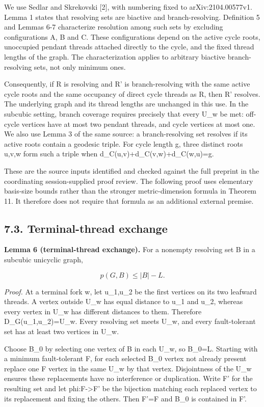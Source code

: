 \documentclass[
]{article}
\newcounter{none} %
\begin{document}
We use Sedlar and Skrekovski {[}2{]}, with numbering fixed to
arXiv:2104.00577v1. Lemma 1 states that resolving sets are biactive and
branch-resolving. Definition 5 and Lemmas 6-7 characterize resolution
among such sets by excluding configurations A, B and C. These
configurations depend on the active cycle roots, unoccupied pendant
threads attached directly to the cycle, and the fixed thread lengths of
the graph. The characterization applies to arbitrary biactive
branch-resolving sets, not only minimum ones.

Consequently, if R is resolving and R' is branch-resolving with the same
active cycle roots and the same occupancy of direct cycle threads as R,
then R' resolves. The underlying graph and its thread lengths are
unchanged in this use. In the subcubic setting, branch coverage requires
precisely that every U\_w be met: off-cycle vertices have at most two
pendant threads, and cycle vertices at most one. We also use Lemma 3 of
the same source: a branch-resolving set resolves if its active roots
contain a geodesic triple. For cycle length g, three distinct roots
u,v,w form such a triple when d\_C(u,v)+d\_C(v,w)+d\_C(w,u)=g.

These are the source inputs identified and checked against the full
preprint in the coordinating session-supplied proof review. The
following proof uses elementary basis-size bounds rather than the
stronger metric-dimension formula in Theorem 11. It therefore does not
require that formula as an additional external premise.

\subsection{7.3. Terminal-thread
exchange}\label{terminal-thread-exchange}

\textbf{Lemma 6 (terminal-thread exchange).} For a nonempty resolving
set B in a subcubic unicyclic graph,

\[p(G,B)\le |B|-L.\]

\emph{Proof.} At a terminal fork w, let u\_1,u\_2 be the first vertices
on its two leafward threads. A vertex outside U\_w has equal distance to
u\_1 and u\_2, whereas every vertex in U\_w has different distances to
them. Therefore D\_G(u\_1,u\_2)=U\_w. Every resolving set meets U\_w,
and every fault-tolerant set has at least two vertices in U\_w.

Choose B\_0 by selecting one vertex of B in each U\_w, so
\textbar B\_0\textbar=L. Starting with a minimum fault-tolerant F, for
each selected B\_0 vertex not already present replace one F vertex in
the same U\_w by that vertex. Disjointness of the U\_w ensures these
replacements have no interference or duplication. Write F' for the
resulting set and let phi:F-\textgreater F' be the bijection matching
each replaced vertex to its replacement and fixing the others. Then
\textbar F'\textbar=\textbar F\textbar{} and B\_0 is contained in F'.
\end{document}
